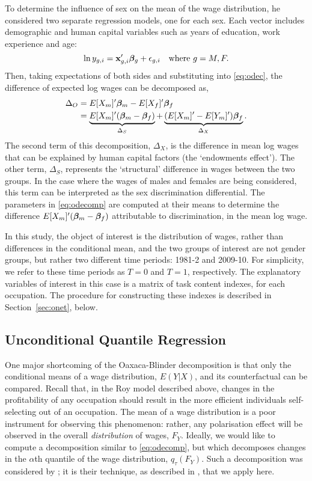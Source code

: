 To determine the influence of sex on the mean of the wage distribution, he considered two separate regression models, one for each sex. Each vector includes demographic and human capital variables such as years of education, work experience and age:
$$  \ln y_{g,i} = \mathbf{x}_{g,i}'\boldsymbol{\beta}_g + \epsilon_{g,i} \quad \text{where}\ g=M,F. $$
Then, taking expectations of both sides and substituting into \eqref{eq:odec}, the difference of expected log wages can be decomposed as,
\begin{align}
  \Delta_O &= E[X_m]'\boldsymbol{\beta}_m -  E[X_f]'\boldsymbol{\beta}_f \notag \\
  &= \underbrace{E[X_m]'(\boldsymbol{\beta}_m - \boldsymbol{\beta}_f)}_{\Delta_S} + \underbrace{(E[X_m]'-E[Y_m]')\boldsymbol{\beta}_f}_{\Delta_X}. \label{eq:odecomp}
\end{align}
The second term of this decomposition, $\Delta_X$, is the difference in mean log wages that can be explained by human capital factors (the `endowments effect'). The other term, $\Delta_S$, represents the `structural' difference in wages between the two groups. In the case where the wages of males and females are being considered, this term can be interpreted as the sex discrimination differential. The parameters in \eqref{eq:odecomp} are computed at their means to determine the difference $E[X_m]'(\boldsymbol{\beta}_m - \boldsymbol{\beta}_f)$ attributable to discrimination, in the mean log wage.

In this study, the object of interest is the distribution of wages, rather than differences in the conditional mean, and the two groups of interest are not gender groups, but rather two different time periods: 1981-2 and 2009-10. For simplicity, we refer to these time periods as $T=0$ and $T=1$, respectively. The explanatory variables of interest in this case is a matrix of task content indexes, for each occupation. The procedure for constructing these indexes is described in Section~\ref{sec:onet}, below.

\subsection{Unconditional Quantile Regression}
One major shortcoming of the Oaxaca-Blinder decomposition is that only the conditional means of a wage distribution, $E(Y|X)$, and its counterfactual can be compared. Recall that, in the Roy model described above, changes in the profitability of any occupation should result in the more efficient individuals self-selecting out of an occupation. The mean of a wage distribution is a poor instrument for observing this phenomenon: rather, any polarisation effect will be observed in the overall {\em distribution} of wages, $F_Y$. Ideally, we would like to compute a decomposition similar to \eqref{eq:odecomp}, but which decomposes changes in the $\alpha$th quantile of the wage distribution, $q_\tau(F_Y)$. Such a decomposition was considered by \citet{Firpo2011}; it is their technique, as described in \citet{Firpo2009}, that we apply here.

